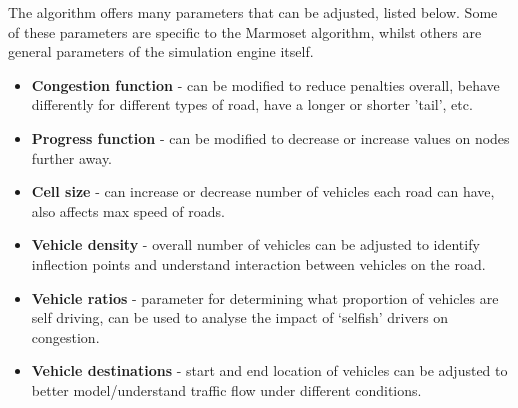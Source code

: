 \documentclass[ %
                    author={Alexander Hill},
                supervisor={Dr. Benjamin Sach},
                    degree={MEng},
                     title={MARMOSET},
                  subtitle={Multi-Agent Route Management using Online Simulation for Efficient Transportation},
                      type={research},
                      year={2016} ]{dissertation}
\begin{document}
The algorithm offers many parameters that can be adjusted, listed below. Some of
these parameters are specific to the Marmoset algorithm, whilst others are
general parameters of the simulation engine itself.

\begin{itemize}
    \item \textbf{Congestion function} - can be modified to reduce penalties overall,
        behave differently for different types of road, have a longer or shorter
        'tail', etc.
    \item \textbf{Progress function} - can be modified to decrease or increase
        values on nodes further away.
    \item \textbf{Cell size} - can increase or decrease number of vehicles each
    road can have, also affects max speed of roads.
    \item \textbf{Vehicle density} - overall number of vehicles can be adjusted
        to identify inflection points and understand interaction between
        vehicles on the road.
    \item \textbf{Vehicle ratios} - parameter for determining what proportion of
        vehicles are self driving, can be used to analyse the impact of
        `selfish' drivers on congestion.
    \item \textbf{Vehicle destinations} - start and end location of vehicles can
        be adjusted to better model/understand traffic flow under different
        conditions.
\end{itemize}



\end{document}
